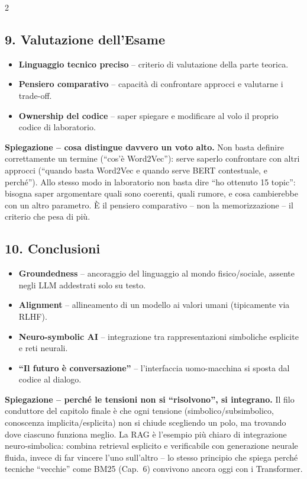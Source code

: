 \documentclass[10pt,a4paper]{extarticle}
\begin{document}
\begin{multicols}{2}
\subsection*{9. Valutazione dell'Esame}
\begin{itemize}
\item \textbf{Linguaggio tecnico preciso} -- criterio di valutazione della parte teorica.
\item \textbf{Pensiero comparativo} -- capacit\`a di confrontare approcci e valutarne i trade-off.
\item \textbf{Ownership del codice} -- saper spiegare e modificare al volo il proprio codice di laboratorio.
\end{itemize}
\smallskip\noindent\textbf{\textcolor{blue!45!black}{Spiegazione -- cosa distingue davvero un voto alto.}} Non basta definire correttamente un termine (``cos'\`e Word2Vec''): serve saperlo confrontare con altri approcci (``quando basta Word2Vec e quando serve BERT contestuale, e perch\'e''). Allo stesso modo in laboratorio non basta dire ``ho ottenuto 15 topic'': bisogna saper argomentare quali sono coerenti, quali rumore, e cosa cambierebbe con un altro parametro. \`E il pensiero comparativo -- non la memorizzazione -- il criterio che pesa di pi\`u.

\subsection*{10. Conclusioni}
\begin{itemize}
\item \textbf{Groundedness} -- ancoraggio del linguaggio al mondo fisico/sociale, assente negli LLM addestrati solo su testo.
\item \textbf{Alignment} -- allineamento di un modello ai valori umani (tipicamente via RLHF).
\item \textbf{Neuro-symbolic AI} -- integrazione tra rappresentazioni simboliche esplicite e reti neurali.
\item \textbf{``Il futuro \`e conversazione''} -- l'interfaccia uomo-macchina si sposta dal codice al dialogo.
\end{itemize}
\smallskip\noindent\textbf{\textcolor{blue!45!black}{Spiegazione -- perch\'e le tensioni non si ``risolvono'', si integrano.}} Il filo conduttore del capitolo finale \`e che ogni tensione (simbolico/subsimbolico, conoscenza implicita/esplicita) non si chiude scegliendo un polo, ma trovando dove ciascuno funziona meglio. La RAG \`e l'esempio pi\`u chiaro di integrazione neuro-simbolica: combina retrieval esplicito e verificabile con generazione neurale fluida, invece di far vincere l'uno sull'altro -- lo stesso principio che spiega perch\'e tecniche ``vecchie'' come BM25 (Cap.~6) convivono ancora oggi con i Transformer.

\end{multicols}
\end{document}
